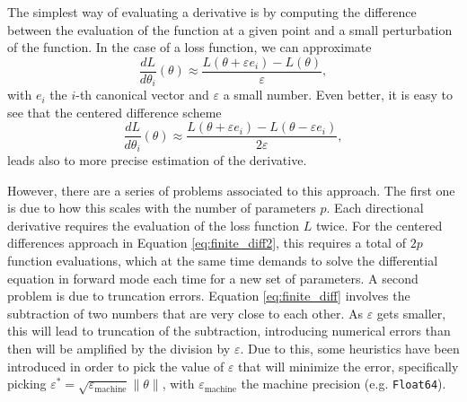 The simplest way of evaluating a derivative is by computing the difference between the evaluation of the function at a given point and a small perturbation of the function. 
In the case of a loss function, we can approximate
\begin{equation}
 \frac{dL}{d\theta_i} (\theta) \approx \frac{L(\theta + \varepsilon e_i ) - L(\theta)}{\varepsilon},
 \label{eq:finite_diff}
\end{equation}
with $e_i$ the $i$-th canonical vector and $\varepsilon$ a small number. 
Even better, it is easy to see that the centered difference scheme
\begin{equation}
 \frac{dL}{d\theta_i} (\theta) \approx \frac{L(\theta + \varepsilon e_i ) - L(\theta - \varepsilon e_i)}{2\varepsilon},
 \label{eq:finite_diff2}
\end{equation}
leads also to more precise estimation of the derivative.

However, there are a series of problems associated to this approach. 
The first one is due to how this scales with the number of parameters $p$. 
Each directional derivative requires the evaluation of the loss function $L$ twice. 
For the centered differences approach in Equation \eqref{eq:finite_diff2}, this requires a total of $2p$ function evaluations, which at the same time demands to solve the differential equation in forward mode each time for a new set of parameters.
A second problem is due to truncation errors. 
Equation \eqref{eq:finite_diff} involves the subtraction of two numbers that are very close to each other. 
As $\varepsilon$ gets smaller, this will lead to truncation of the subtraction, introducing numerical errors than then will be amplified by the division by $\varepsilon$.
Due to this, some heuristics have been introduced in order to pick the value of $\varepsilon$ that will minimize the error, specifically picking $\varepsilon^* = \sqrt{\varepsilon_\text{machine}} \| \theta \|$, with $\varepsilon_\text{machine}$ the machine precision (e.g. \texttt{Float64}).
 

